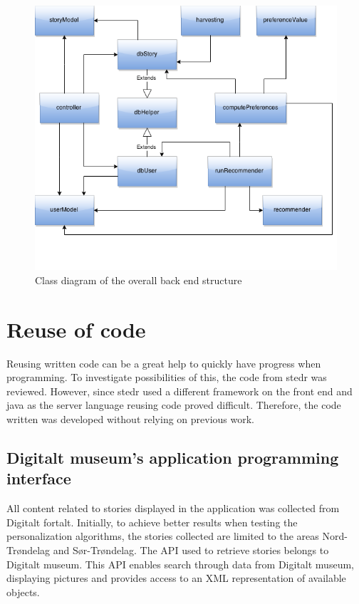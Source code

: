 \begin{figure}[h!]
	\centering
	\includegraphics[width=\textwidth]{fig/overall_backend}
	\caption{Class diagram of the overall back end structure}
	\label{Fig:overall_backend}
\end{figure}

\section{Reuse of code}

Reusing written code can be a great help to quickly have progress when programming.  To investigate possibilities of this, the code from stedr was reviewed. However, since stedr used a different framework on the front end and java as the server language reusing code proved difficult. Therefore, the code written was developed without relying on previous work.

\subsection{Digitalt museum’s application programming interface}
\label{subsec:api}

All content related to stories displayed in the application was collected from Digitalt fortalt. Initially, to achieve better results when testing the personalization algorithms, the stories collected are limited to the areas Nord-Trøndelag and Sør-Trøndelag. The API \cite{digitaltMuseum} used to retrieve stories belongs to Digitalt museum. This API enables search through data from Digitalt museum, displaying pictures and provides access to an XML representation of available objects.\newline

